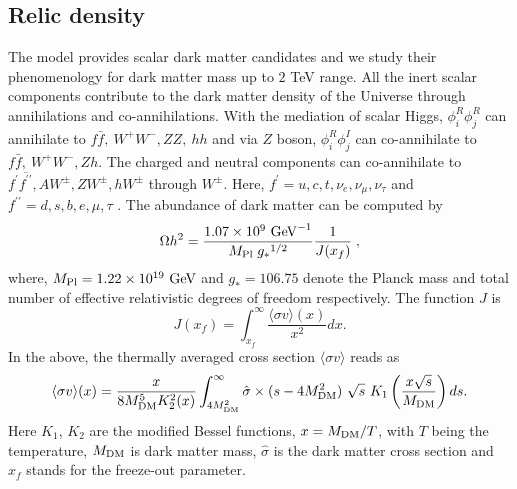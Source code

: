\documentclass[aps, a4paper,superscriptaddress,12pt,preprintnumbers,floatfix,nofootinbib,amsmath,amssymb]{revtex4}
\begin{document}
\subsection{Relic density}
The model provides scalar dark matter candidates and we study their phenomenology for dark matter mass up to $2$ TeV range. All the inert scalar components contribute to the dark matter density of the Universe through annihilations and co-annihilations. With the mediation of scalar Higgs, $\phi^R_i \phi^R_j$ can annihilate to $f\bar{f}, ~W^+W^-,ZZ, ~hh$ and via $Z$ boson, $\phi^R_i \phi^I_j$ can co-annihilate to $f\bar{f}, ~W^+W^-, Zh$. The charged and neutral components can co-annihilate to $f^\prime \overline{f^{\prime\prime}}, A W^\pm, Z W^\pm, h W^\pm$ through $W^\pm$. Here, $f^\prime = u,c,t,\nu_e,\nu_\mu, \nu_\tau$ and $f^{\prime\prime} = d,s,b,e,\mu,\tau$ \cite{LopezHonorez:2006gr, Barbieri:2006dq, Dolle:2009fn}. The abundance of dark matter can be computed by
\begin{equation}
\label{eq:relicdensity}
\Omega h^2 = \frac{1.07 \times 10^{9} ~{\rm{GeV}}^{-1}}{  M_{\rm{Pl}}\; {g_\ast}^{1/2}}\frac{1}{J(x_f)}\;,
\end{equation}
%
where, $M_{\rm{Pl}}=1.22 \times 10^{19} ~\rm{GeV}$ and $g_\ast = 106.75$ denote the Planck mass and total number of effective relativistic degrees of freedom respectively. The function $J$ is
%
\begin{equation}
J(x_f)=\int_{x_f}^{\infty} \frac{ \langle \sigma v \rangle (x)}{x^2} dx.
\end{equation}
%
In the above, the thermally averaged cross section $\langle \sigma v \rangle$ reads  as
%
\begin{equation}
 \langle\sigma v\rangle (x) = \frac{x}{8 M_{\rm DM}^5 K_2^2(x)} \int_{4 M_{\rm DM}^2}^\infty \hat{\sigma} \times ( s - 4 M_{\rm DM}^2) \ \sqrt{s} \ K_1 \left(\frac{x \sqrt{s}}{M_{\rm DM}}\right) ds.
\end{equation}
Here $K_1$, $K_2$ are the modified Bessel functions, $x = M_{\rm DM}/T$, with $T$ being the temperature, $M_{\rm  DM}$ is dark matter mass, $\hat  \sigma$ is the dark matter cross section and $x_f$ stands for the freeze-out parameter. 
\end{document}
